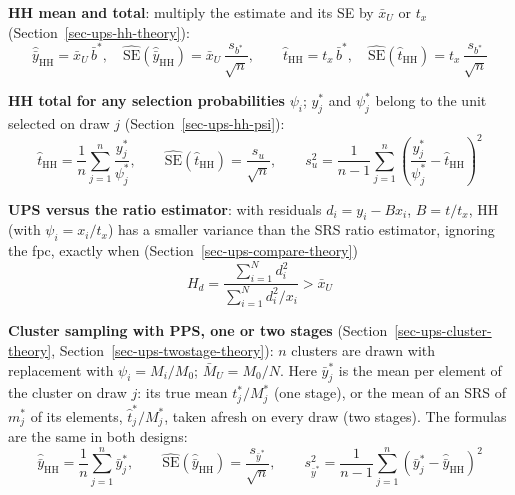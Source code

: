 \documentclass[
  letterpaper,
  DIV=11,
  numbers=noendperiod]{scrreprt}
\renewcommand{\[}{\begin{equation}}
\renewcommand{\]}{\end{equation}}
\begin{document}
\textbf{HH mean and total}: multiply the estimate and its SE by
\(\bar x_U\) or \(t_x\) (Section~\ref{sec-ups-hh-theory}): \[
\boxed{
\hat{\bar{y}}_{\mathrm{HH}}=\bar{x}_U\,\bar{b}^*,\quad
\widehat{\mathrm{SE}}(\hat{\bar{y}}_{\mathrm{HH}})=\bar{x}_U\,\frac{s_{b^*}}{\sqrt{n}},\qquad
\hat{t}_{\mathrm{HH}}=t_x\,\bar{b}^*,\quad
\widehat{\mathrm{SE}}(\hat{t}_{\mathrm{HH}})=t_x\,\frac{s_{b^*}}{\sqrt{n}}}
\]

\textbf{HH total for any selection probabilities} \(\psi_i\); \(y_j^*\)
and \(\psi_j^*\) belong to the unit selected on draw \(j\)
(Section~\ref{sec-ups-hh-psi}): \[
\boxed{\hat{t}_{\mathrm{HH}}=\frac1n\sum_{j=1}^n\frac{y_j^*}{\psi_j^*},\qquad
\widehat{\mathrm{SE}}(\hat{t}_{\mathrm{HH}})=\frac{s_u}{\sqrt n},\qquad
s_u^2=\frac{1}{n-1}\sum_{j=1}^n\left(\frac{y_j^*}{\psi_j^*}-\hat{t}_{\mathrm{HH}}\right)^2}
\]

\textbf{UPS versus the ratio estimator}: with residuals
\(d_i = y_i - Bx_i\), \(B = t/t_x\), HH (with \(\psi_i = x_i/t_x\)) has
a smaller variance than the SRS ratio estimator, ignoring the fpc,
exactly when (Section~\ref{sec-ups-compare-theory}) \[
\boxed{H_d=\frac{\sum_{i=1}^N d_i^2}{\sum_{i=1}^N d_i^2/x_i}>\bar{x}_U}
\]

\textbf{Cluster sampling with PPS, one or two stages}
(Section~\ref{sec-ups-cluster-theory},
Section~\ref{sec-ups-twostage-theory}): \(n\) clusters are drawn with
replacement with \(\psi_i = M_i/M_0\); \(\bar M_U = M_0/N\). Here
\(\bar y_j^*\) is the mean per element of the cluster on draw \(j\): its
true mean \(t_j^*/M_j^*\) (one stage), or the mean of an SRS of
\(m_j^*\) of its elements, \(\hat t_j^*/M_j^*\), taken afresh on every
draw (two stages). The formulas are the same in both designs: \[
\boxed{\hat{\bar{y}}_{\mathrm{HH}}=\frac{1}{n}\sum_{j=1}^n \bar{y}_j^*,\qquad
\widehat{\mathrm{SE}}(\hat{\bar{y}}_{\mathrm{HH}})=\frac{s_{\bar{y}^*}}{\sqrt{n}},\qquad
s_{\bar{y}^*}^2=\frac{1}{n-1}\sum_{j=1}^n\left(\bar{y}_j^*-\hat{\bar{y}}_{\mathrm{HH}}\right)^2}
\]
\end{document}
